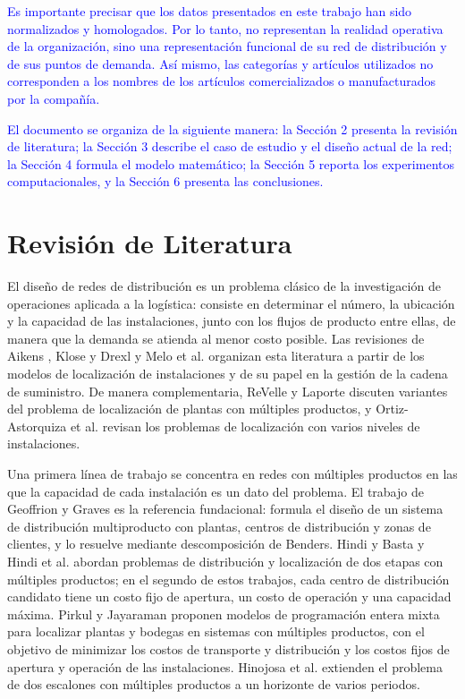 \documentclass[fleqn, 11pt,letterpaper]{article}
\begin{document}
\vspace{1mm}

\textcolor{blue}{Es importante precisar que los datos presentados en este trabajo han sido normalizados y homologados. Por lo tanto, no representan la realidad operativa de la organización, sino una representación funcional de su red de distribución y de sus puntos de demanda. Así mismo, las categorías y artículos utilizados no corresponden a los nombres de los artículos comercializados o manufacturados por la compañía.}

\vspace{1mm}

\textcolor{blue}{El documento se organiza de la siguiente manera: la Sección 2 presenta la revisión de literatura; la Sección 3 describe el caso de estudio y el diseño actual de la red; la Sección 4 formula el modelo matemático; la Sección 5 reporta los experimentos computacionales, y la Sección 6 presenta las conclusiones.}

\section{Revisión de Literatura}
El diseño de redes de distribución es un problema clásico de la investigación de operaciones aplicada a la logística: consiste en determinar el número, la ubicación y la capacidad de las instalaciones, junto con los flujos de producto entre ellas, de manera que la demanda se atienda al menor costo posible. Las revisiones de Aikens \cite{Aik85}, Klose y Drexl \cite{Klo05} y Melo et al. \cite{Mel09} organizan esta literatura a partir de los modelos de localización de instalaciones y de su papel en la gestión de la cadena de suministro. De manera complementaria, ReVelle y Laporte \cite{Rev96} discuten variantes del problema de localización de plantas con múltiples productos, y Ortiz-Astorquiza et al. \cite{Ort17} revisan los problemas de localización con varios niveles de instalaciones.

Una primera línea de trabajo se concentra en redes con múltiples productos en las que la capacidad de cada instalación es un dato del problema. El trabajo de Geoffrion y Graves \cite{Geo74} es la referencia fundacional: formula el diseño de un sistema de distribución multiproducto con plantas, centros de distribución y zonas de clientes, y lo resuelve mediante descomposición de Benders. Hindi y Basta \cite{Hin94} y Hindi et al. \cite{Hin98} abordan problemas de distribución y localización de dos etapas con múltiples productos; en el segundo de estos trabajos, cada centro de distribución candidato tiene un costo fijo de apertura, un costo de operación y una capacidad máxima. Pirkul y Jayaraman \cite{Pir96, Pir98} proponen modelos de programación entera mixta para localizar plantas y bodegas en sistemas con múltiples productos, con el objetivo de minimizar los costos de transporte y distribución y los costos fijos de apertura y operación de las instalaciones. Hinojosa et al. \cite{Hin00} extienden el problema de dos escalones con múltiples productos a un horizonte de varios periodos.
\end{document}
